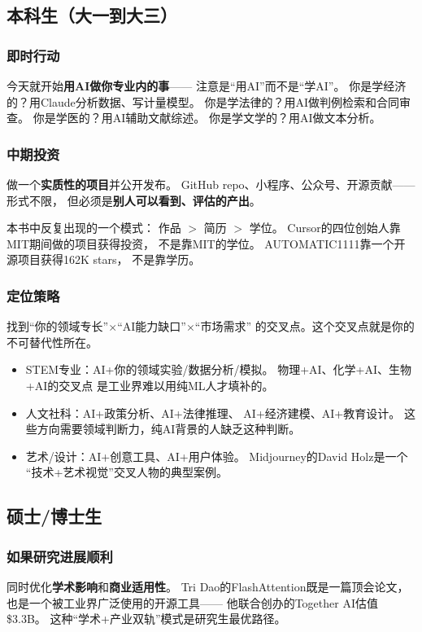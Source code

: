 \subsection{本科生（大一到大三）}

\subsubsection{即时行动}
今天就开始\textbf{用AI做你专业内的事}——
注意是``用AI''而不是``学AI''。
你是学经济的？用Claude分析数据、写计量模型。
你是学法律的？用AI做判例检索和合同审查。
你是学医的？用AI辅助文献综述。
你是学文学的？用AI做文本分析。

\subsubsection{中期投资}
做一个\textbf{实质性的项目}并公开发布。
GitHub repo、小程序、公众号、开源贡献——形式不限，
但必须是\textbf{别人可以看到、评估的产出}。

本书中反复出现的一个模式：
作品 $>$ 简历 $>$ 学位。
Cursor的四位创始人靠MIT期间做的项目获得投资，
不是靠MIT的学位。
AUTOMATIC1111靠一个开源项目获得162K stars，
不是靠学历。

\subsubsection{定位策略}
找到``你的领域专长''$\times$``AI能力缺口''$\times$``市场需求''
的交叉点。这个交叉点就是你的不可替代性所在。

\begin{itemize}
  \item STEM专业：AI+你的领域实验/数据分析/模拟。
    物理+AI、化学+AI、生物+AI的交叉点
    是工业界难以用纯ML人才填补的。
  \item 人文社科：AI+政策分析、AI+法律推理、
    AI+经济建模、AI+教育设计。
    这些方向需要领域判断力，纯AI背景的人缺乏这种判断。
  \item 艺术/设计：AI+创意工具、AI+用户体验。
    Midjourney的David Holz是一个
    ``技术+艺术视觉''交叉人物的典型案例。
\end{itemize}

\subsection{硕士/博士生}

\subsubsection{如果研究进展顺利}
同时优化\textbf{学术影响}和\textbf{商业适用性}。
Tri Dao的FlashAttention既是一篇顶会论文，
也是一个被工业界广泛使用的开源工具——
他联合创办的Together AI估值\$3.3B。
这种``学术+产业双轨''模式是研究生最优路径。

